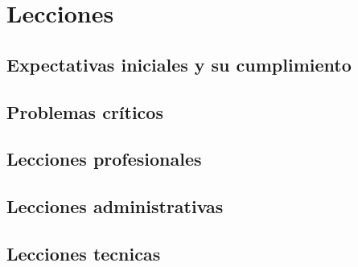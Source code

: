 \chapter{Lecciones}

\section{Expectativas iniciales y su cumplimiento} %

\section{Problemas cr\'iticos} %

\section{Lecciones profesionales} %

\section{Lecciones administrativas} %

\section{Lecciones tecnicas} %
